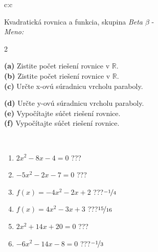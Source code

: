 \documentclass[10pt]{report}
\begin{document}
\begin{tabular}{c:c}
\begin{minipage}[c][104.5mm][t]{0.5\linewidth}
\begin{center}
\vspace{7mm}
{\huge {\LARGE Kvadratická rovnica a funkcia}, skupina \textit{Beta $\beta$} -}\\[5mm]
\textit{Meno:}\phantom{xxxxxxxxxxxxxxxxxxxxxxxxxxxxxxxxxxxxxxxxxxxxxxxxxxxxxxxxxxxxxxxxx}\\[5mm]
\begin{minipage}{0.95\linewidth}
\begin{center}
{\small \begin{multicols}{2} \raggedright
\textbf{(a)} Zistite počet riešení rovnice v \(\mathbb{R}\). \\[1mm]
\textbf{(b)} Zistite počet riešení rovnice v \(\mathbb{R}\). \\[1mm]
\textbf{(c)} Určte x-ovú súradnicu vrcholu paraboly. \par \columnbreak
\textbf{(d)} Určte y-ovú súradnicu vrcholu paraboly. \\[1mm]
\textbf{(e)} Vypočítajte súčet riešení rovnice. \\[1mm]
\textbf{(f)} Vypočítajte súčet riešení rovnice.
\end{multicols}
}
\end{center}
\end{minipage}
\\[4mm]
\begin{minipage}{0.79\linewidth}
\begin{center}
\begin{varwidth}{\linewidth}
\begin{enumerate}
\Large
\item $2x^2-8x-4=0$\quad \dotfill\; ???\;\dotfill {}
\item $-5x^2-2x-7=0$\quad \dotfill\; ???\;\dotfill {}
\item $f(x)=-4x^2-2x+2$\quad \dotfill\; ???\;\dotfill \quad $\nicefrac{-1}{4}$
\item $f(x)=4x^2-3x+3$\quad \dotfill\; ???\;\dotfill \quad $\nicefrac{15}{16}$
\item $2x^2+14x+20=0$\quad \dotfill\; ???\;\dotfill {}
\item $-6x^2-14x-8=0$\quad \dotfill\; ???\;\dotfill \quad $\nicefrac{-1}{3}$
\end{enumerate}
\end{varwidth}
\end{center}

\end{minipage}
\end{center}
\end{minipage}
\end{tabular}
\end{document}
